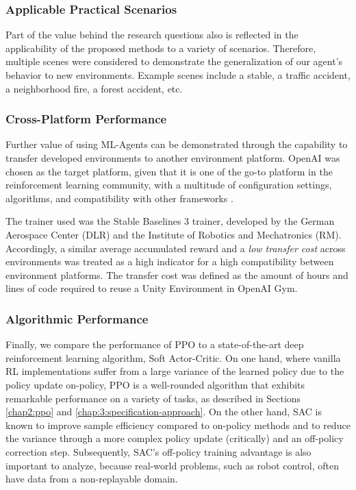 \subsubsection{Applicable Practical Scenarios}\label{chap:3:further-generalization}
Part of the value behind the research questions also is reflected in the applicability of the proposed methods to a variety of scenarios. 
Therefore, multiple scenes were considered to demonstrate the generalization of our agent's behavior to new environments. Example scenes include a stable, a traffic accident, a neighborhood fire, a forest accident, etc.

\subsubsection{Cross-Platform Performance}\label{chap:3:further-generalization}
Further value of using ML-Agents can be demonstrated through the capability to transfer developed environments to another environment platform. OpenAI \cite{github-openai-gym} was chosen as the target platform, given that it is one of the go-to platform in the reinforcement learning community, with a multitude of configuration settings, algorithms, and compatibility with other frameworks \cite{github-openai-gym}.

The trainer used was the Stable Baselines 3 \cite{github-dlr-rm-baselines3} trainer, developed by the German Aerospace Center (DLR) and the Institute of Robotics and Mechatronics (RM). Accordingly, a similar average accumulated reward and a \textit{low transfer cost} across environments was treated as a high indicator for a high compatibility between environment platforms.  The transfer cost was defined as the amount of hours and lines of code required to reuse a Unity Environment in OpenAI Gym.

\subsubsection{Algorithmic Performance} \label{chap:3:algorithmic-performance}
Finally, we compare the performance of PPO to a state-of-the-art deep reinforcement learning algorithm, Soft Actor-Critic. 
On one hand, where vanilla RL implementations suffer from a large variance of the learned policy due to the policy update on-policy, PPO is a well-rounded algorithm that exhibits remarkable performance on a variety of tasks, as described in Sections \ref{chap2:ppo} and \ref{chap:3:specification-approach}. On the other hand, SAC is known to improve sample efficiency compared to on-policy methods and to reduce the variance through a more complex policy update (critically) and an off-policy correction step. Subsequently, SAC's off-policy training advantage is also important to analyze, because real-world problems, such as robot control, often have data from a non-replayable domain. 



